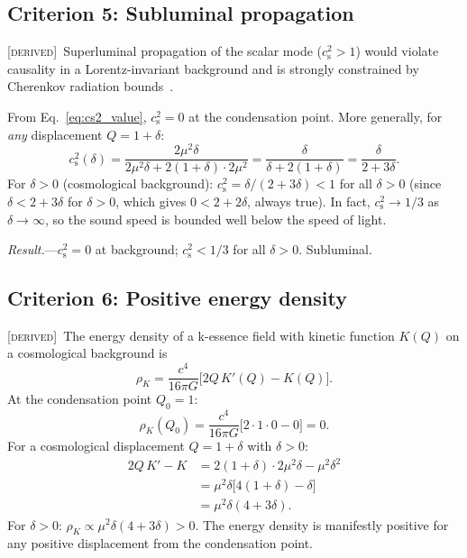 \documentclass[prd,twocolumn,superscriptaddress,longbibliography,floatfix]{revtex4-2}
\newcommand{\cs}{c_{\mathrm{s}}}
\newcommand{\derived}{\textsc{[derived]}}
\begin{document}
\subsection{Criterion 5: Subluminal propagation}
\label{sec:subluminal}

\derived\ Superluminal propagation of the scalar mode ($\cs^2 > 1$)
would violate causality in a Lorentz-invariant background and is
strongly constrained by Cherenkov radiation bounds~\cite{Elliott2005}.

From Eq.~\eqref{eq:cs2_value}, $\cs^2 = 0$ at the condensation
point.  More generally, for \emph{any} displacement $Q = 1 + \delta$:
\begin{equation}
\cs^2(\delta) = \frac{2\mu^2\delta}{2\mu^2\delta + 2(1+\delta)\cdot 2\mu^2}
= \frac{\delta}{\delta + 2(1+\delta)}
= \frac{\delta}{2 + 3\delta}.
\label{eq:cs2_general}
\end{equation}
For $\delta > 0$ (cosmological background):
$\cs^2 = \delta/(2+3\delta) < 1$ for all $\delta > 0$
(since $\delta < 2 + 3\delta$ for $\delta > 0$, which
gives $0 < 2 + 2\delta$, always true).
In fact, $\cs^2 \to 1/3$ as $\delta \to \infty$, so the
sound speed is bounded well below the speed of light.

\textit{Result.}---$\cs^2 = 0$ at background; $\cs^2 < 1/3$
for all $\delta > 0$.  Subluminal.  \checkmark


\subsection{Criterion 6: Positive energy density}
\label{sec:energy}

\derived\ The energy density of a k-essence field with kinetic
function $K(Q)$ on a cosmological background
is~\cite{Scherrer2004,BS2024}
\begin{equation}
\rho_K = \frac{c^4}{16\pi G}\big[2Q\,K'(Q) - K(Q)\big].
\label{eq:rhoK}
\end{equation}
At the condensation point $Q_0 = 1$:
\begin{equation}
\rho_K(Q_0) = \frac{c^4}{16\pi G}\big[2 \cdot 1 \cdot 0 - 0\big] = 0.
\label{eq:rho0}
\end{equation}
For a cosmological displacement $Q = 1 + \delta$ with $\delta > 0$:
\begin{align}
2Q\,K' - K &= 2(1+\delta)\cdot 2\mu^2\delta - \mu^2\delta^2
\nonumber\\
&= \mu^2\delta\big[4(1+\delta) - \delta\big]
\nonumber\\
&= \mu^2\delta(4 + 3\delta).
\label{eq:rho_perturb}
\end{align}
For $\delta > 0$: $\rho_K \propto \mu^2\delta(4+3\delta) > 0$.
The energy density is manifestly positive for any positive
displacement from the condensation point.
\end{document}
